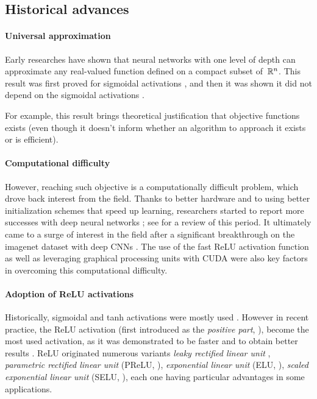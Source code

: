 \subsection{Historical advances}

\paragraph{Universal approximation}
Early researches have shown that neural networks with one level of depth can approximate any real-valued function defined on a compact subset of~$\mathbb{R}^n$. This result was first proved for sigmoidal activations \citep{cybenko1989approximation}, and then it was shown it did not depend on the sigmoidal activations \citep{hornik1989multilayer,hornik1991approximation}.

For example, this result brings theoretical justification that objective functions exists (even though it doesn't inform whether an algorithm to approach it exists or is efficient).

\paragraph{Computational difficulty}
However, reaching such objective is a computationally difficult problem, which drove back interest from the field. Thanks to better hardware and to using better initialization schemes that speed up learning, researchers started to report more successes with deep neural networks \citep{hinton2006fast,glorot2010understanding} ; see \citep{bengio2009learning} for a review of this period. It ultimately came to a surge of interest in the field after a significant breakthrough on the imagenet dataset \citep{deng2009imagenet} with deep CNNs \citep{krizhevsky2012imagenet}. The use of the fast ReLU activation function \citep{glorot2011deep} as well as leveraging graphical processing units with CUDA \citep{nickolls2008scalable} were also key factors in overcoming this computational difficulty.

\paragraph{Adoption of ReLU activations}
Historically, sigmoidal and tanh activations were mostly used \citep{cybenko1989approximation, lecun1989backpropagation}. However in recent practice, the ReLU activation (first introduced as the \emph{positive part}, \cite{jarrett2009best}), become the most used activation, as it was demonstrated to be faster and to obtain better results \citep{glorot2011deep}. ReLU originated numerous variants \eg \emph{leaky rectified linear unit} \citep{maas2013rectifier}, \emph{parametric rectified linear unit} (PReLU, \cite{he2015delving}), \emph{exponential linear unit} (ELU, \cite{clevert2015fast}), \emph{scaled exponential linear unit} (SELU, \cite{Klambauer2017self}), each one having particular advantages in some applications.

